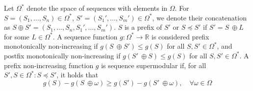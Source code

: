 \documentclass{article} %
\begin{document}
Let $\Omega^*$ denote the space of sequences with elements in $\Omega$. For $S = (S_1, \dots, S_n) \in \Omega^*$,  $S' = (S_1', \dots, S_m') \in \Omega^*$, we denote their concatenation as $S \oplus S' = (S_1, \dots, S_n, S_1', \dots, S_m')$. $S$ is a prefix of $S'$ or $S \preceq S'$ if $S' = S \ \oplus L$ for some $L \in \Omega^*$.
A sequence function $g: \Omega^* \to \mathbb{R}$ is considered prefix monotonically non-increasing if $g(S \ \oplus S') \leq g(S)$ for all $S, S' \in \Omega^*$, and postfix monotonically non-increasing if $g(S' \ \oplus S) \leq g(S)$ for all $S, S' \in \Omega^*$. A prefix non-increasing function $g$ is sequence supermodular if, for all $S', S \in \Omega^*: S \preceq S'$, it holds that
\begin{equation}\label{eqn:supermod}
    g(S) - g(S \ \oplus \omega ) \geq g(S') - g(S' \ \oplus \omega ), \quad \forall \omega \in \Omega
\end{equation}
\end{document}
